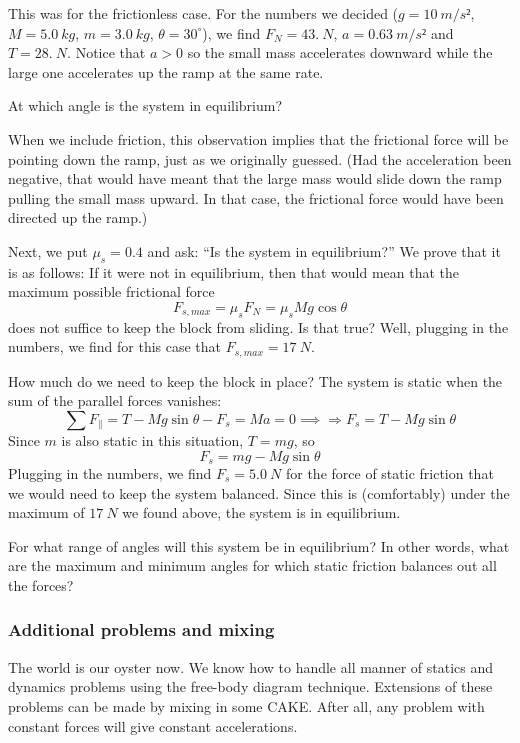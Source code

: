 This was for the frictionless case. For the numbers we decided ($g=10\ m/s²$, $M= 5.0\ kg$, $m=3.0\ kg$, $θ = 30^∘$), we find $F_N= 43.\ N$, $a = 0.63\ m/s²$ and $T= 28.\ N$. 
Notice that $a>0$ so the small mass accelerates downward while the large one accelerates up the ramp at the same rate.
\begin{exercise} 
At which angle is the system in equilibrium?
\end{exercise}

When we include friction, this observation implies that the frictional force will be pointing down the ramp, just as we originally guessed. (Had the acceleration been negative, that would have meant that the large mass would slide down the ramp pulling the small mass upward. In that case, the frictional force would have been directed up the ramp.)

Next, we put $μ_s = 0.4$ and ask: “Is the system in equilibrium?” 
We prove that it is as follows: If it were not in equilibrium, then that would mean that the maximum possible frictional force 
$$
F_{s,max} = μ_s F_N = μ_s Mg \cos θ 
$$
does not suffice to keep the block from sliding. Is that true? 
Well, plugging in the numbers, we find for this case that $F_{s,max} = 17\ N$. 

How much do we need to keep the block in place? The system is static when the sum of the parallel forces vanishes:
$$
∑ F_{\parallel} = T - Mg\sin θ -F_s = M a= 0
\implies{⇒}
F_s = T - Mg\sin θ
$$
Since $m$ is also static in this situation, $T=mg$, so 
$$
F_s = mg - Mg\sin θ
$$
Plugging in the numbers, we find $F_s = 5.0\ N$ for the force of static friction that we would need to keep the system balanced. Since this is (comfortably) under the maximum of $17\ N$ we found above, the system is in equilibrium.
\begin{exercise}
For what range of angles will this system be in equilibrium? In other words, what are the maximum and minimum angles for which static friction balances out all the forces?
\end{exercise}


\subsubsection{Additional problems and mixing}

The world is our oyster now. We know how to handle all manner of statics and dynamics problems using the free-body diagram technique. Extensions of these problems can be made by mixing in some CAKE. After all, any problem with constant forces will give constant accelerations. 

